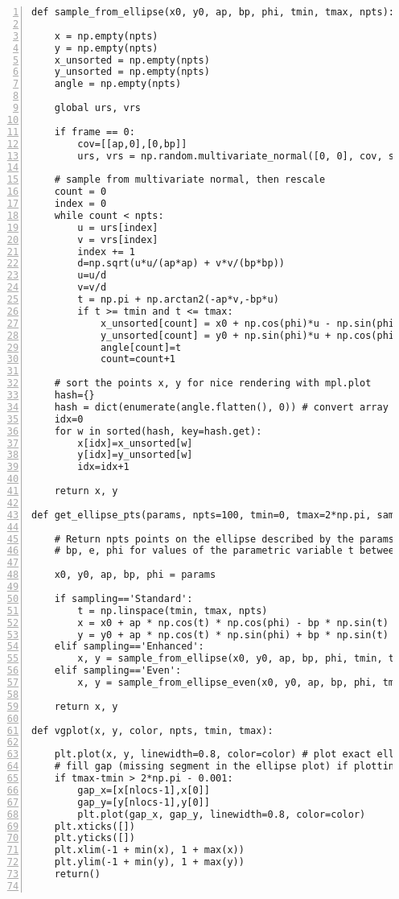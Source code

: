 \documentclass[oneside,10pt]{book}
\begin{document}
\begin{lstlisting}[numbers=left]
def sample_from_ellipse(x0, y0, ap, bp, phi, tmin, tmax, npts): 

    x = np.empty(npts)
    y = np.empty(npts)
    x_unsorted = np.empty(npts)
    y_unsorted = np.empty(npts)
    angle = np.empty(npts)

    global urs, vrs

    if frame == 0:
        cov=[[ap,0],[0,bp]]
        urs, vrs = np.random.multivariate_normal([0, 0], cov, size = npts_max).T

    # sample from multivariate normal, then rescale 
    count = 0
    index = 0
    while count < npts:
        u = urs[index]
        v = vrs[index]
        index += 1
        d=np.sqrt(u*u/(ap*ap) + v*v/(bp*bp))
        u=u/d
        v=v/d
        t = np.pi + np.arctan2(-ap*v,-bp*u)   
        if t >= tmin and t <= tmax:
            x_unsorted[count] = x0 + np.cos(phi)*u - np.sin(phi)*v
            y_unsorted[count] = y0 + np.sin(phi)*u + np.cos(phi)*v
            angle[count]=t
            count=count+1

    # sort the points x, y for nice rendering with mpl.plot
    hash={}
    hash = dict(enumerate(angle.flatten(), 0)) # convert array angle to dictionary
    idx=0
    for w in sorted(hash, key=hash.get):
        x[idx]=x_unsorted[w]
        y[idx]=y_unsorted[w]
        idx=idx+1

    return x, y

def get_ellipse_pts(params, npts=100, tmin=0, tmax=2*np.pi, sampling='Standard'):

    # Return npts points on the ellipse described by the params = x0, y0, ap,
    # bp, e, phi for values of the parametric variable t between tmin and tmax.

    x0, y0, ap, bp, phi = params
    
    if sampling=='Standard':
        t = np.linspace(tmin, tmax, npts)
        x = x0 + ap * np.cos(t) * np.cos(phi) - bp * np.sin(t) * np.sin(phi)
        y = y0 + ap * np.cos(t) * np.sin(phi) + bp * np.sin(t) * np.cos(phi)
    elif sampling=='Enhanced':
        x, y = sample_from_ellipse(x0, y0, ap, bp, phi, tmin, tmax, npts) 
    elif sampling=='Even':
        x, y = sample_from_ellipse_even(x0, y0, ap, bp, phi, tmin, tmax, npts) 

    return x, y

def vgplot(x, y, color, npts, tmin, tmax):

    plt.plot(x, y, linewidth=0.8, color=color) # plot exact ellipse 
    # fill gap (missing segment in the ellipse plot) if plotting full ellipse
    if tmax-tmin > 2*np.pi - 0.001:
        gap_x=[x[nlocs-1],x[0]]
        gap_y=[y[nlocs-1],y[0]]
        plt.plot(gap_x, gap_y, linewidth=0.8, color=color)
    plt.xticks([])  
    plt.yticks([])  
    plt.xlim(-1 + min(x), 1 + max(x)) 
    plt.ylim(-1 + min(y), 1 + max(y)) 
    return()


\end{lstlisting}
\end{document}

